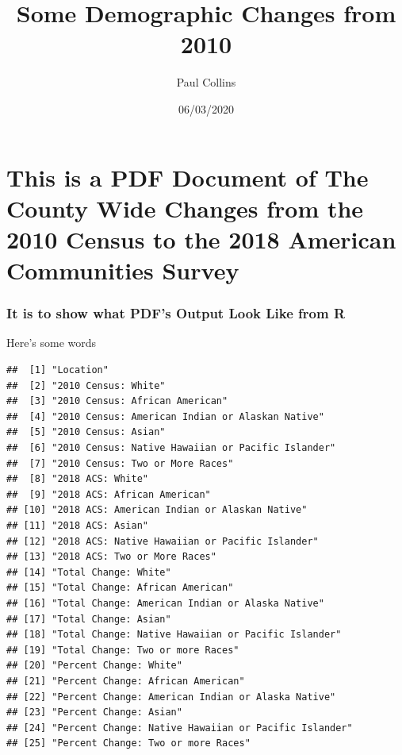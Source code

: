 \documentclass[
]{article}
\title{Some Demographic Changes from 2010}
\author{Paul Collins}
\date{06/03/2020}
\begin{document}
\maketitle

\hypertarget{this-is-a-pdf-document-of-the-county-wide-changes-from-the-2010-census-to-the-2018-american-communities-survey}{%
\section{This is a PDF Document of The County Wide Changes from the 2010
Census to the 2018 American Communities
Survey}\label{this-is-a-pdf-document-of-the-county-wide-changes-from-the-2010-census-to-the-2018-american-communities-survey}}

\hypertarget{it-is-to-show-what-pdfs-output-look-like-from-r}{%
\subsubsection{It is to show what PDF's Output Look Like from
R}\label{it-is-to-show-what-pdfs-output-look-like-from-r}}

Here's some words

\begin{verbatim}
##  [1] "Location"                                           
##  [2] "2010 Census: White"                                 
##  [3] "2010 Census: African American"                      
##  [4] "2010 Census: American Indian or Alaskan Native"     
##  [5] "2010 Census: Asian"                                 
##  [6] "2010 Census: Native Hawaiian or Pacific Islander"   
##  [7] "2010 Census: Two or More Races"                     
##  [8] "2018 ACS: White"                                    
##  [9] "2018 ACS: African American"                         
## [10] "2018 ACS: American Indian or Alaskan Native"        
## [11] "2018 ACS: Asian"                                    
## [12] "2018 ACS: Native Hawaiian or Pacific Islander"      
## [13] "2018 ACS: Two or More Races"                        
## [14] "Total Change: White"                                
## [15] "Total Change: African American"                     
## [16] "Total Change: American Indian or Alaska Native"     
## [17] "Total Change: Asian"                                
## [18] "Total Change: Native Hawaiian or Pacific Islander"  
## [19] "Total Change: Two or more Races"                    
## [20] "Percent Change: White"                              
## [21] "Percent Change: African American"                   
## [22] "Percent Change: American Indian or Alaska Native"   
## [23] "Percent Change: Asian"                              
## [24] "Percent Change: Native Hawaiian or Pacific Islander"
## [25] "Percent Change: Two or more Races"
\end{verbatim}
\end{document}
